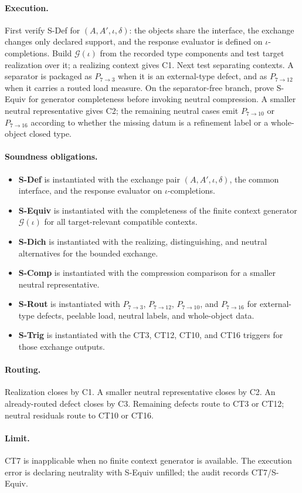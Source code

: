 \documentclass[
  11pt,
]{article}
\providecommand{\tightlist}{%
  \setlength{\itemsep}{0pt}\setlength{\parskip}{0pt}}
\theoremstyle{definition}
\newcommand{\ctpar}[1]{\paragraph{#1.}}
\begin{document}
\ctpar{Execution}
First verify S-Def for \((A,A',\iota,\delta)\): the objects share the
interface, the exchange changes only declared support, and the response
evaluator is defined on \(\iota\)-completions.  Build
\(\mathcal G(\iota)\) from the recorded type components and test target
realization over it; a realizing context gives C1.  Next test separating
contexts.  A separator is packaged as \(P_{7\to3}\) when it is an
external-type defect, and as \(P_{7\to12}\) when it carries a routed
load measure.  On the separator-free branch, prove S-Equiv for generator
completeness before invoking neutral compression.  A smaller neutral
representative gives C2; the remaining neutral cases emit
\(P_{7\to10}\) or \(P_{7\to16}\) according to whether the missing datum
is a refinement label or a whole-object closed type.

\ctpar{Soundness obligations}
\begin{itemize}
\tightlist
\item \textbf{S-Def} is instantiated with the exchange pair \((A,A',\iota,\delta)\), the common interface, and the response evaluator on \(\iota\)-completions.
\item \textbf{S-Equiv} is instantiated with the completeness of the finite context generator \(\mathcal G(\iota)\) for all target-relevant compatible contexts.
\item \textbf{S-Dich} is instantiated with the realizing, distinguishing, and neutral alternatives for the bounded exchange.
\item \textbf{S-Comp} is instantiated with the compression comparison for a smaller neutral representative.
\item \textbf{S-Rout} is instantiated with \(P_{7\to3}\), \(P_{7\to12}\), \(P_{7\to10}\), and \(P_{7\to16}\) for external-type defects, peelable load, neutral labels, and whole-object data.
\item \textbf{S-Trig} is instantiated with the CT3, CT12, CT10, and CT16 triggers for those exchange outputs.
\end{itemize}

\ctpar{Routing}
Realization closes by C1.  A smaller neutral representative closes by
C2.  An already-routed defect closes by C3.  Remaining defects route to
CT3 or CT12; neutral residuals route to CT10 or CT16.

\ctpar{Limit}
CT7 is inapplicable when no finite context generator is available. The
execution error is declaring neutrality with S-Equiv unfilled; the audit
records CT7/S-Equiv.
\end{document}
